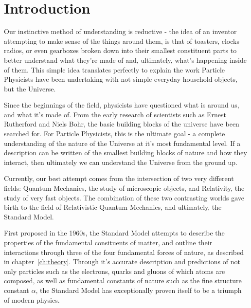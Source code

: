 
\chapter{Introduction}  %

\ifpdf
    \graphicspath{{Chapter1/Figs/Raster/}{Chapter1/Figs/PDF/}{Chapter1/Figs/}}
\else
    \graphicspath{{Chapter1/Figs/Vector/}{Chapter1/Figs/}}
\fi


\label{sec:introduction_intro}

Our instinctive method of understanding is reductive - the idea of an
inventor attempting to make sense of the things around them, is
that of toasters, clocks radios, or even gearboxes broken down into
their smallest constituent parts to better understand what they're made of and,
ultimately, what's happening inside of them. This simple idea translates
perfectly to explain the work Particle Physicists have been undertaking with
not simple everyday household objects, but the Universe.

Since the beginnings of the field, physicists have questioned
what is
around us, and what it's made of. From the early research of scientists such as
Ernest Rutherford and Niels Bohr, the basic building
blocks of the universe have been searched for. For Particle Physicists, this is
the ultimate goal - a complete understanding of the nature of the Universe
at it's most
fundamental level. If a description can be written of the smallest
building blocks of
nature and how they interact, then ultimately we can understand
the Universe from the ground up.

Currently, our best attempt comes from the intersection of two very different
fields: Quantum Mechanics, the study of microscopic objects, and Relativity, the
study of very fast objects. The combination of these
two contrasting worlds gave birth to the field of Relativistic
Quantum Mechanics, and ultimately, the Standard Model.

First proposed in the 1960s, the Standard Model attempts to describe the
properties of the fundamental consituents of matter, and outline their
interactions through three of the four fundamental forces of nature, as
described in chapter~\ref{ch:theory}. Through
it's accurate description and predictions of not only particles such as
the electrons, quarks and gluons of which atoms are composed,
as well as fundamental constants of nature such as the fine structure constant
$\alpha$, the
Standard Model has exceptionally proven itself to be a triumph of
modern physics.

